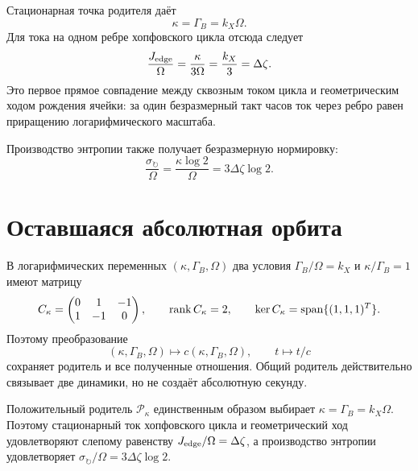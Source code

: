 Стационарная точка родителя даёт
\begin{equation}
 \kappa=\Gamma_B=k_X\Omega.
 \label{eq:v10-conductance-birth-identification}
\end{equation}
Для тока на одном ребре хопфовского цикла отсюда следует
\begin{equation}
 \frac{J_{\rm edge}}{\Omega}
 =\frac{\kappa}{3\Omega}
 =\frac{k_X}{3}
 =\Delta\zeta.
 \label{eq:v10-conductance-blind-current}
\end{equation}
Это первое прямое совпадение между сквозным током цикла и геометрическим
ходом рождения ячейки: за один безразмерный такт часов ток через ребро равен
приращению логарифмического масштаба.

Производство энтропии также получает безразмерную нормировку:
\begin{equation}
 \frac{\sigma_\circlearrowright}{\Omega}
 =\frac{\kappa\log2}{\Omega}
 =3\Delta\zeta\log2.
 \label{eq:v10-conductance-blind-entropy}
\end{equation}

\section{Оставшаяся абсолютная орбита}

В логарифмических переменных $(\kappa,\Gamma_B,\Omega)$ два условия
$\Gamma_B/\Omega=k_X$ и $\kappa/\Gamma_B=1$ имеют матрицу
\begin{equation}
 C_\kappa=
 \begin{pmatrix}
 0&1&-1\\
 1&-1&0
 \end{pmatrix},
 \qquad \operatorname{rank} C_\kappa=2,
 \qquad \ker C_\kappa=\operatorname{span}\{(1,1,1)^T\}.
 \label{eq:v10-conductance-scale-map}
\end{equation}
Поэтому преобразование
\begin{equation}
 (\kappa,\Gamma_B,\Omega)\longmapsto
 c(\kappa,\Gamma_B,\Omega),
 \qquad t\longmapsto t/c
 \label{eq:v10-conductance-scale-orbit}
\end{equation}
сохраняет родитель и все полученные отношения. Общий родитель действительно
связывает две динамики, но не создаёт абсолютную секунду.

\begin{theorem}
Положительный родитель $\mathcal P_\kappa$ единственным образом выбирает
$\kappa=\Gamma_B=k_X\Omega$. Поэтому стационарный ток хопфовского цикла и
геометрический ход удовлетворяют слепому равенству
$J_{\rm edge}/\Omega=\Delta\zeta$, а производство энтропии удовлетворяет
$\sigma_\circlearrowright/\Omega=3\Delta\zeta\log2$.
\end{theorem}

